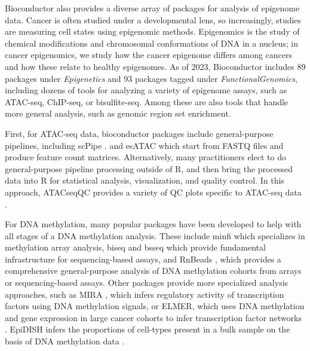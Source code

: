 \documentclass[graybox]{svmult}
\begin{document}
Bioconductor also provides a diverse array of packages for analysis of epigenome
data. Cancer is often studied under a developmental lens, so increasingly, studies
are measuring cell states using epigenomic methods. Epigenomics is the study of
chemical modifications and chromosomal conformations of DNA in a nucleus; in cancer
epigenomics, we study how the cancer epigenome differs among cancers and how
these relate to healthy epigenomes. As of 2023, Bioconductor includes 89 packages
under \emph{Epigenetics} and 93 packages tagged under \emph{FunctionalGenomics}, including dozens of tools
for analyzing a variety of epigenome assays, such as ATAC-seq, ChIP-seq, or
bisulfite-seq. Among these are also tools that handle more general analysis, such
as genomic region set enrichment.

First, for ATAC-seq data, bioconductor packages include general-purpose pipelines, including scPipe
\cite{Tian2018}. %
and esATAC \cite{Wei2018} %
which start from FASTQ files and produce feature count
matrices. Alternatively, many practitioners elect to do general-purpose pipeline processing outside of
R, and then bring the processed data into R for statistical analysis,
visualization, and quality control. In this approach, ATACseqQC
provides
a variety of QC plots specific to ATAC-seq data \cite{Ou2018}.%

For DNA methylation, many popular packages have been developed to help with
all stages of a DNA methylation analysis. These include minfi 
\cite{Aryee2014}
which specializes in methylation array analysis, biseq and bsseq \cite{Hansen2012}  %
which provide fundamental infrastructure for sequencing-based assays, and RnBeads
\cite{Mueller2019},
which provides a comprehensive general-purpose analysis of DNA
methylation cohorts from arrays or sequencing-based assays. Other packages provide more specialized
analysis approaches, such as MIRA \cite{Lawson2018}, %
which infers regulatory
activity of transcription factors using DNA methylation signals, %
or ELMER, which uses DNA methylation and gene expression in large cancer
cohorts to infer transcription factor networks \cite{Silva2019}. %
EpiDISH infers
the proportions of cell-types present in a bulk sample on the basis
of DNA methylation data \cite{Zheng2018a}. %
\end{document}
